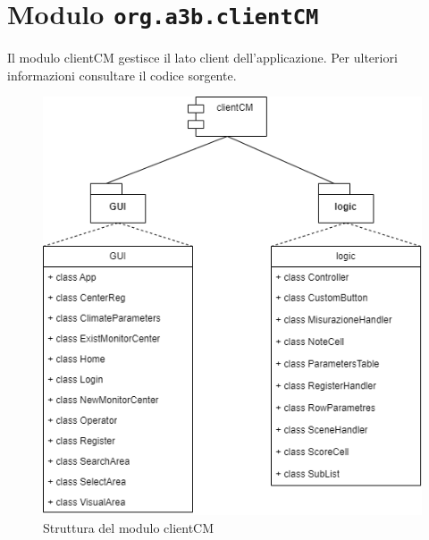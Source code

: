 \chapter{Modulo \texttt{org.a3b.clientCM}}
\label{ch:client}
Il modulo clientCM gestisce il lato client dell'applicazione. Per ulteriori informazioni consultare il codice sorgente.

\begin{figure}[h]
	\centering
	\caption{Struttura del modulo clientCM}
	\label{fig:clientcm}
	\includegraphics[width=0.7\linewidth]{../../fig/img/tecnico/clientCM.drawio}
\end{figure}

